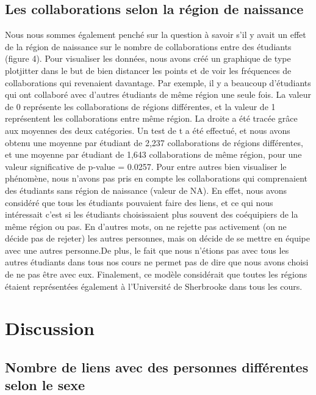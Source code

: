 \documentclass[twoside,twocolumn]{article}
\begin{document}
\subsection{Les collaborations selon la région de naissance}

Nous nous sommes également penché sur la question à savoir s'il y avait un effet de la région de naissance sur le nombre de collaborations entre des étudiants (figure 4). Pour visualiser les données, nous avons créé un graphique de type plotjitter dans le but de bien distancer les points et de voir les fréquences de collaborations qui revenaient davantage. Par exemple, il y a beaucoup d'étudiants qui ont collaboré avec d'autres étudiants de même région une seule fois. La valeur de 0 représente les collaborations de régions différentes, et la valeur de 1 représentent les collaborations entre même région. La droite a été tracée grâce aux moyennes des deux catégories. Un test de t a été effectué, et nous avons obtenu une moyenne par étudiant de 2,237 collaborations de régions différentes, et une moyenne par étudiant de 1,643 collaborations de même région, pour une valeur significative de p-value = 0.0257. Pour entre autres bien visualiser le phénomène, nous n'avons pas pris en compte les collaborations qui comprenaient des étudiants sans région de naissance (valeur de NA). En effet, nous avons considéré que tous les étudiants pouvaient faire des liens, et ce qui nous intéressait c'est si les étudiants choisissaient plus souvent des coéquipiers de la même région ou pas. En d'autres mots, on ne rejette pas activement (on ne décide pas de rejeter) les autres personnes, mais on décide de se mettre en équipe avec une autres personne.De plus, le fait que nous n'étions pas avec tous les autres étudiants dans tous nos cours ne permet pas de dire que nous avons choisi de ne pas être avec eux. Finalement, ce modèle considérait que toutes les régions étaient représentées également à l'Université de Sherbrooke dans tous les cours.





\section{Discussion}

\subsection{Nombre de liens avec des personnes différentes selon le sexe}
\end{document}

